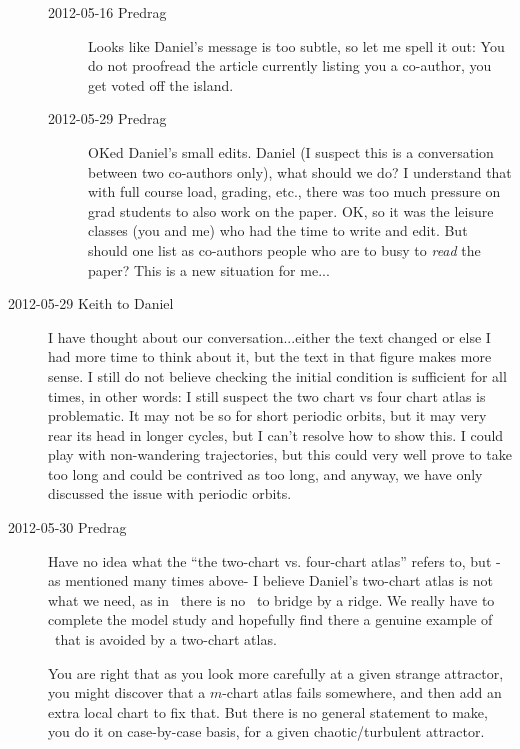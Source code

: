 \begin{description}
\begin{description}
\item[2012-05-16 Predrag] Looks like Daniel's message is too subtle, so
    let me spell it out: You do not proofread the article currently
    listing you a co-author, you get voted off the island.

\item[2012-05-29 Predrag] OKed Daniel's small edits. Daniel (I suspect
    this is a conversation between two co-authors only), what should we
    do? I understand that with full course load, grading, etc., there was
    too much pressure on grad students to also work on the paper. OK, so
    it was the leisure classes (you and me) who had the time to write and
    edit. But should one list as co-authors people who are to busy to
    \emph{read} the paper? This is a new situation for me...

\end{description}

\item[2012-05-29 Keith to Daniel]  I have thought about our
conversation...either the text changed or else I had more time to think
about it, but the text in that figure makes more sense.  I still do not
believe checking the initial condition is sufficient for all times, in
other words: I still suspect the two chart vs four chart atlas is
problematic.  It may not be so for short periodic orbits, but it may very
rear its head in longer cycles, but I can't resolve how to show this.  I
could play with non-wandering trajectories, but this could very well
prove to take too long and could be contrived as too long, and anyway, we
have only discussed the issue with periodic orbits.

\item[2012-05-30 Predrag] Have no idea what the ``the two-chart vs.
four-chart atlas'' refers to, but -as mentioned many times above- I
believe Daniel's two-chart atlas is not what we need, as in \cLf\ there
is no \chartBord\ to bridge by a ridge. We really have to complete the
{\twoMode} model study and hopefully find there a genuine example of
\chartBord\ that is avoided by a two-chart atlas.

You are right that  as you look more carefully at a given strange
attractor, you might discover that a $m$-chart atlas fails somewhere, and
then add an extra local chart to fix that. But there is no general
statement to make, you do it on case-by-case basis, for a given
chaotic/turbulent attractor.


\end{description}
